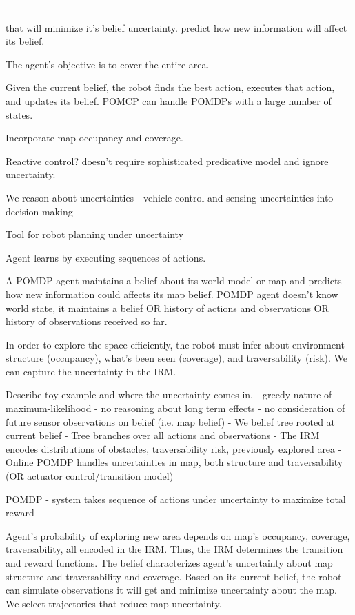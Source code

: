 \documentclass{article}
\begin{document}
----------------------------------------------------------------------

that will minimize it's belief uncertainty.  predict how new information will affect its belief. 



The agent's objective is to cover the entire area. 

Given the current belief, the robot finds the best action, executes that action, and updates its belief. POMCP can handle POMDPs with a large number of states.

Incorporate map occupancy and coverage.

Reactive control? doesn't require sophisticated predicative model and ignore uncertainty.

We reason about uncertainties - vehicle control and sensing uncertainties into decision making

Tool for robot planning under uncertainty

Agent learns by executing sequences of actions.

A POMDP agent maintains a belief about its world model or map and predicts how new information could affects its map belief. POMDP agent doesn't know world state, it maintains a belief OR history of actions and observations OR history of observations received so far. 

In order to explore the space efficiently, the robot must infer about environment structure (occupancy), what's been seen (coverage), and traversability (risk). We can capture the uncertainty in the IRM. 

Describe toy example and where the uncertainty comes in.
- greedy nature of maximum-likelihood 
- no reasoning about long term effects
- no consideration of future sensor observations on belief (i.e. map belief)
- We belief tree rooted at current belief
- Tree branches over all actions and observations
- The IRM encodes distributions of obstacles, traversability risk, previously explored area
- Online POMDP handles uncertainties in map, both structure and traversability (OR actuator control/transition model)

POMDP 
- system takes sequence of actions under uncertainty to maximize total reward

Agent's probability of exploring new area depends on map's occupancy, coverage, traversability, all encoded in the IRM. Thus, the IRM determines the transition and reward functions. The belief characterizes agent's uncertainty about map structure and traversability and coverage. Based on its current belief, the robot can simulate observations it will get and minimize uncertainty about the map. We select trajectories that reduce map uncertainty. 
\end{document}
